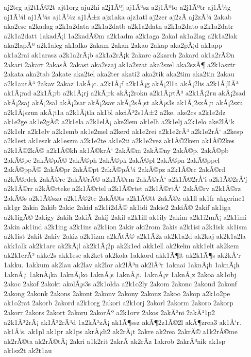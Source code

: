{aj2teg
aj2t1Ã©2t
ajt1org
aju2hi
a2j1Ãºj
aj1Ãºsz
a2j1Ãºto
a2j1Ãºtr
aj1Ã¼g
aj1Ã¼l
aj1Ã¼s
aj1Ã¼z
aj1Å±z
ajz1aka
ajz1atl
aj2zer
aj2zÃ­
aj2zÃ¼
2akab
aka2cse
a2kadag
a2k1a2data
a2k1a2datb
a2k1a2datn
a2k1a2dato
a2k1a2datr
a2k1a2datt
1akadÃ¡l
1a2kadÃ©m
a2k1adm
a2k1aga
2akal
ak1a2lag
a2k1a2lak
aka2lapÃº
a2k1aleg
ak1alko
2akam
2akan
2akao
2akap
aka2pÃ¡d
ak1app
ak1a2rai
ak1arasz
a2k1a2rÃ¡b
a2k1a2rÃ¡k
2akarc
a2karch
2akard
ak1a2rÃ©n
2akari
2akarr
2akasÃ­
2akast
aka2szaj
ak1a2szat
aka2szel
aka2szÃ¶
a2k1asztr
2akata
aka2tab
2akate
aka2tel
aka2ter
akati2
aka2tik
aka2tim
aka2tin
2akau
a2k1autÃ³
2akav
2akaz
1akÃ¡c.
a2k1Ã¡f
a2k1Ã¡g
akÃ¡2l1a
akÃ¡2lis
a2k1Ã¡llÃ³
ak1Ã¡rad
a2k1Ã¡rb
a2k1Ã¡rj
a2kÃ¡rk
akÃ¡2rokn
a2k1Ã¡rtÃ³
a2k1Ã¡2ru
akÃ¡2sad
akÃ¡2saj
akÃ¡2sal
akÃ¡2sar
akÃ¡2sav
akÃ¡2sÃ¡st
akÃ¡s3s
ak1Ã¡2szÃ¡n
akÃ¡2szu
a2k1Ã¡szun
akÃ¡t1a
a2k1Ã¡tla
ak1bl
akciÃ³2s1Å±2
a2ke.
ake2cs
a2k1e2dz
ak1e2ge
ak1e2gÃ©
a2k1ela
a2k1elÃ¡
ake2lem
ak1elh
a2k1elj
a2k1elo
ake2lÅ‘k
a2k1elr
a2k1elv
a2k1emb
ak1e2mel
a2kerd
ak1e2rei
a2k1e2rÃ³
a2k1e2rÅ‘
a2kesp
a2k1est
ak1eszk
ak1eszm
a2k1e2te
ak1e2ti
a2k1e2vez
ak1Ã©2kem
ak1Ã©2kes
a2k1Ã©2kÃ©
a2k1Ã©kh
ak1Ã©krÅ‘
2akÃ©m
2akÃ©ny
2akÃ©p.
2akÃ©pb
2akÃ©pe
2akÃ©pÃ©
2akÃ©ph
2akÃ©pk
2akÃ©pl
2akÃ©pn
2akÃ©ppel
2akÃ©ppÃ©
2akÃ©pr
2akÃ©pt
2akÃ©pÃ¼
2akÃ©pz
a2k1Ã©rc
2akÃ©rd
a2kÃ©rdek
2akÃ©re
2akÃ©rÃ©
a2k1Ã©rm
2akÃ©rÅ‘
a2k1Ã©2rÅ‘i
a2k1Ã©2rÅ‘j
a2k1Ã©rr
a2kÃ©rteke
a2k1Ã©rtel
a2k1Ã©rtet
a2k1Ã©rtÅ‘
2akÃ©rv
a2k1Ã©rz
2akÃ©s
a2k1Ã©sza
a2k1Ã©2te
2akÃ©ts
a2k1Ã©tt
2akÃ©z
ak1fl
ak1fr
akgerinc1
ak1gr
2akia
2akib
2akic
2akid
a2k1i2dÃ©
ak1idi
2akie2
2akiÃ©
2akif
ak1iga
a2k1igÃ©
2akigy
2akih
2akiÃ­
2akij
2akil
a2k1ill
ak1ily
2akim
a2k1i2mÃ¡
a2k1imi
2akin
ak1ind
a2k1ing
a2k1ins
a2k1ion
2akir
aki2rom
2akis
a2k1isi
a2k1isk
ak1ism
a2k1ist
2akit
2akiv
2akiz
a2k1izm
a2kÃ­tÃ©
a2k1Ã­2z
ak2k1a2d
ak2kaj
ak2k1a2la
akk1alk
ak2k1arc
ak2kÃ¡l
ak2k1Ã¡2p
ak2k1ed
akk1ell
ak2kelm
akk1elt
ak2kem
ak2k1erÃ³
akke2s
akk1ese
ak2ket
ak2kola
1akkord
akk1Ã¶lt
ak2k1Ã¶s
ak2kÅ‘r
1akku.
1akkum
ak2lau
ak2lav
ak2lor
ak2lÃ³n
ak2lÃ³r
1aknai
1aknÃ¡b
1aknÃ¡h
1aknÃ¡i
1aknÃ¡ka
1aknÃ¡ko
1aknÃ¡s
1aknÃ¡t.
1aknÃ¡v
1aknÃ¡z
2akoa
ak1obj
2akoc
2akof
2akokt
akolÃ¡s3s
a2k1olda
a2k1o2ly
2akom
2akonc
2akond
2akonf
2akong
2akonk
2akons
2akont
2akonv
2akony
2akonz
2akoo
2akop
a2k1o2pe
ak1o2rat
2akorb
2akord
a2k1org
2akori
a2k1orj
2akorl
2akorm
2akoro
2akorp
2akorr
2akors
2akort
2akoru
2akorÃº
a2k1orv
2akos
2akÃ³ni
2akÃ³1p2
a2k1Ã³2rÃ¡
ak1Ã³2rÃ³d
1a2kÃ³zÃ¡
ak1Ã¶ssz
akÃ¶2z1Ã©2l
akÃ¶zrea3
ak1Å‘r.
ak1Å‘s.
ak1pl
ak1pr
ak1ps
akrÃ¡di2
ak2rÃ¡t
2akre
ak2rea
2akrÃ©
a1k2rÃ©me
ak2rÃ©ta
ak2rÃ©tÃ¡
2akri
a1k2rit
2akrÃ­
ak2rÃ­z
1akrob
2akrÃ³nik
ak1sp
ak1sz2t
ak2t1au
}
